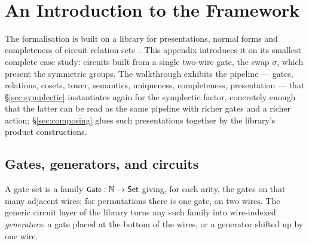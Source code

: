 \begin{code}[hide]
\>[0][@{}l@{\AgdaIndent{0}}]%
\>[2]\AgdaSpace{}%
\AgdaSymbol{:}\AgdaSpace{}%
\AgdaSpace{}%
\AgdaSymbol{\{}\AgdaSymbol{\}}\AgdaSpace{}%
\AgdaSymbol{\{}\AgdaSpace{}%
\AgdaSymbol{:}\AgdaSpace{}%
\AgdaSpace{}%
\AgdaSymbol{\}}\AgdaSpace{}%
\AgdaSpace{}%
\<%
\\
%
\>[2]\AgdaSpace{}%
\AgdaSymbol{:}\AgdaSpace{}%
\AgdaSymbol{\{}\AgdaSpace{}%
\AgdaSymbol{:}\AgdaSpace{}%
\AgdaSpace{}%
\AgdaSpace{}%
\AgdaSymbol{\}}\AgdaSpace{}%
\AgdaSpace{}%
\AgdaSymbol{(}\AgdaSpace{}%
\AgdaSpace{}%
\AgdaSpace{}%
\AgdaSpace{}%
\AgdaSymbol{)}\AgdaSpace{}%
\AgdaSpace{}%
\AgdaSpace{}%
\AgdaSymbol{(}\AgdaSpace{}%
\AgdaSpace{}%
\AgdaSymbol{)}\<%
\end{code}
\section{An Introduction to the Framework}\label{sec:permutations}

The formalisation is built on a library for presentations, normal forms
and completeness of circuit relation
sets~\cite{bian2026framework,qupit-code}.  This appendix introduces it on
its smallest complete case study: circuits built from a single two-wire
gate, the swap $\sigma$, which present the symmetric groups.  The
walkthrough exhibits the pipeline --- gates,
relations, cosets, tower, semantics, uniqueness, completeness,
presentation --- that \S\ref{sec:symplectic} instantiates again for the
symplectic factor, concretely enough that the latter can be read as the
same pipeline with richer gates and a richer action;
\S\ref{sec:composing} glues such presentations together by the
library's product constructions.

\subsection{Gates, generators, and circuits}\label{sec:sn-gates}

A gate set is a family $\mbox{\textsf{\small Gate}} : \mathbb{N} \to \mathsf{Set}$ giving,
for each arity, the gates on that many adjacent wires; for permutations
there is one gate, on two wires.  The generic circuit layer of the
library turns any such family into wire-indexed
\emph{generators}: a gate placed at the bottom of the wires, or a
generator shifted up by one wire.


